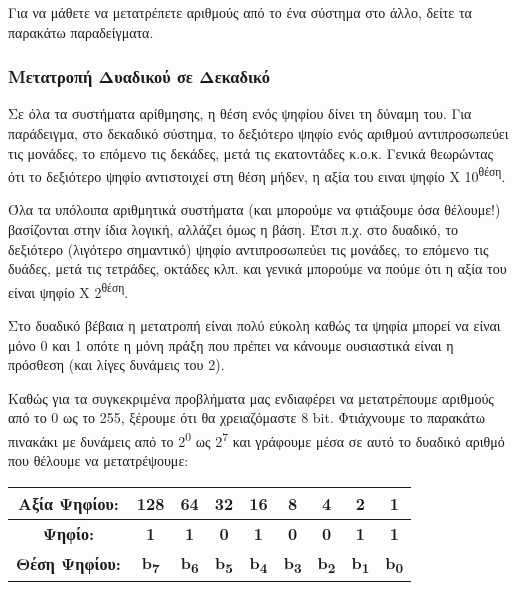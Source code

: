 Για να μάθετε να μετατρέπετε αριθμούς από το ένα σύστημα στο άλλο, δείτε τα παρακάτω παραδείγματα.

\subsubsection*{Μετατροπή Δυαδικού σε Δεκαδικό}

Σε όλα τα συστήματα αρίθμησης, η θέση ενός ψηφίου δίνει τη δύναμη του. Για παράδειγμα, στο δεκαδικό σύστημα, το δεξιότερο ψηφίο ενός αριθμού αντιπροσωπεύει τις μονάδες, το επόμενο τις δεκάδες, μετά τις εκατοντάδες κ.ο.κ. Γενικά θεωρώντας ότι το δεξιότερο ψηφίο αντιστοιχεί στη θέση μήδεν, η αξία του ειναι ψηφίο Χ 10\textsuperscript{θέση}. 

Όλα τα υπόλοιπα αριθμητικά συστήματα (και μπορούμε να φτιάξουμε όσα θέλουμε!) βασίζονται στην ίδια λογική, αλλάζει όμως η βάση. Έτσι π.χ. στο δυαδικό, το δεξιότερο (λιγότερο σημαντικό) ψηφίο αντιπροσωπεύει τις μονάδες, το επόμενο τις δυάδες, μετά τις τετράδες, οκτάδες κλπ. και γενικά μπορούμε να πούμε ότι η αξία του είναι ψηφίο Χ 2\textsuperscript{θέση}.

Στο δυαδικό βέβαια η μετατροπή είναι πολύ εύκολη καθώς τα ψηφία μπορεί να είναι μόνο 0 και 1 οπότε η μόνη πράξη που πρέπει να κάνουμε ουσιαστικά είναι η πρόσθεση (και λίγες δυνάμεις του 2).

Καθώς για τα συγκεκριμένα προβλήματα μας ενδιαφέρει να μετατρέπουμε αριθμούς από το 0 ως το 255, ξέρουμε ότι θα χρειαζόμαστε 8 bit. Φτιάχνουμε το παρακάτω πινακάκι με δυνάμεις από το 2\textsuperscript{0} ως 2\textsuperscript{7} και γράφουμε μέσα σε αυτό το δυαδικό αριθμό που θέλουμε να μετατρέψουμε:

\begin{centering}
\begin{tabular}{|c|c|c|c|c|c|c|c|c|}
\hline
Αξία Ψηφίου: & 128 & 64 & 32 & 16 & 8 & 4 & 2 & 1 \\
\hline
\textbf{Ψηφίο:} & \textbf{1} & \textbf{1} & \textbf{0} & \textbf{1} & \textbf{0} & \textbf{0} & \textbf{1} & \textbf{1} \\
\hline
\textbf{Θέση Ψηφίου:} & \textbf{b\textsubscript{7}}& \textbf{b\textsubscript{6}} & \textbf{b\textsubscript{5}} & \textbf{b\textsubscript{4}} & \textbf{b\textsubscript{3}}& \textbf{b\textsubscript{2}} & \textbf{b\textsubscript{1}} & \textbf{b\textsubscript{0}}  \\
\hline
\end{tabular}
\end{centering}